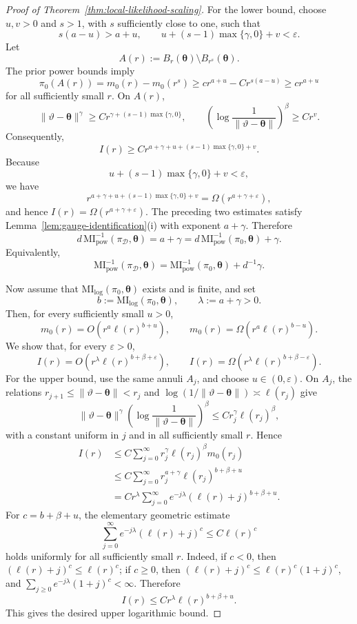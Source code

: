 \documentclass[11pt,a4paper]{article}
\newcommand{\MI}{\mathrm{MI}}
\newcommand{\pa}{\boldsymbol\theta}
\theoremstyle{compactplain}
\theoremstyle{compactdefinition}
\numberwithin{equation}{section}
\begin{document}
\begin{proof}[Proof of Theorem~\ref{thm:local-likelihood-scaling}]
For the lower bound, choose \(u,v>0\) and \(s>1\), with \(s\) sufficiently close
to one, such that
\[
 s(a-u)>a+u,
 \qquad
 u+(s-1)\max\{\gamma,0\}+v<\varepsilon .
\]
Let
\[
 A(r):=B_r(\pa)\setminus B_{r^s}(\pa).
\]
The prior power bounds imply
\[
 \pi_0(A(r))
 =m_0(r)-m_0(r^s)
 \ge c r^{a+u}-C r^{s(a-u)}
 \ge c r^{a+u}
\]
for all sufficiently small \(r\). On \(A(r)\),
\[
 \|\vartheta-\pa\|^\gamma
 \ge C r^{\gamma+(s-1)\max\{\gamma,0\}},
 \qquad
 \left(\log\frac1{\|\vartheta-\pa\|}\right)^\beta
 \ge C r^v .
\]
Consequently,
\[
 I(r)
 \ge C r^{a+\gamma+u+(s-1)\max\{\gamma,0\}+v} .
\]
Because
\[
 u+(s-1)\max\{\gamma,0\}+v<\varepsilon,
\]
we have
\[
 r^{a+\gamma+u+(s-1)\max\{\gamma,0\}+v}
 =\Omega(r^{a+\gamma+\varepsilon}),
\]
and hence \(I(r)=\Omega(r^{a+\gamma+\varepsilon})\).
The preceding two estimates satisfy Lemma~\ref{lem:gauge-identification}\textnormal{(i)}
with exponent \(a+\gamma\). Therefore
\[
 d\,\MI_{\mathrm{pow}}^{-1}(\pi_{\mathcal D},\pa)
 =a+\gamma
 =d\,\MI_{\mathrm{pow}}^{-1}(\pi_0,\pa)+\gamma .
\]
Equivalently,
\[
 \MI_{\mathrm{pow}}^{-1}(\pi_{\mathcal D},\pa)
 =\MI_{\mathrm{pow}}^{-1}(\pi_0,\pa)+d^{-1}\gamma .
\]

Now assume that \(\MI_{\mathrm{log}}(\pi_0,\pa)\) exists and is finite, and set
\[
 b:=\MI_{\mathrm{log}}(\pi_0,\pa),
 \qquad
 \lambda:=a+\gamma>0 .
\]
Then, for every sufficiently small \(u>0\),
\[
 m_0(r)=O\!\left(r^a\ell(r)^{b+u}\right),
 \qquad
 m_0(r)=\Omega\!\left(r^a\ell(r)^{b-u}\right).
\]
We show that, for every \(\varepsilon>0\),
\[
 I(r)=O\!\left(r^\lambda\ell(r)^{b+\beta+\varepsilon}\right),
 \qquad
 I(r)=\Omega\!\left(r^\lambda\ell(r)^{b+\beta-\varepsilon}\right).
\]
For the upper bound, use the same annuli \(A_j\), and choose
\(u\in(0,\varepsilon)\). On \(A_j\), the relations
\(r_{j+1}\le \|\vartheta-\pa\|<r_j\) and
\(\log(1/\|\vartheta-\pa\|)\asymp\ell(r_j)\) give
\[
 \|\vartheta-\pa\|^\gamma
 \left(\log\frac1{\|\vartheta-\pa\|}\right)^\beta
 \le C r_j^\gamma\ell(r_j)^\beta ,
\]
with a constant uniform in \(j\) and in all sufficiently small \(r\).
Hence
\[
\begin{aligned}
 I(r)
 &\le C\sum_{j=0}^{\infty}r_j^\gamma\ell(r_j)^\beta m_0(r_j)\\
 &\le C\sum_{j=0}^{\infty}r_j^{a+\gamma}\ell(r_j)^{b+\beta+u}\\
 &=C r^\lambda\sum_{j=0}^{\infty}e^{-j\lambda}(\ell(r)+j)^{b+\beta+u}.
\end{aligned}
\]
For \(c=b+\beta+u\), the elementary geometric estimate
\[
 \sum_{j=0}^{\infty}e^{-j\lambda}(\ell(r)+j)^c
 \le C\ell(r)^c
\]
holds uniformly for all sufficiently small \(r\). Indeed, if \(c<0\), then
\((\ell(r)+j)^c\le \ell(r)^c\); if \(c\ge0\), then
\((\ell(r)+j)^c\le \ell(r)^c(1+j)^c\), and
\(\sum_{j\ge0}e^{-j\lambda}(1+j)^c<\infty\). Therefore
\[
 I(r)\le C r^\lambda\ell(r)^{b+\beta+u}.
\]
This gives the desired upper logarithmic bound.


\end{proof}
\end{document}
